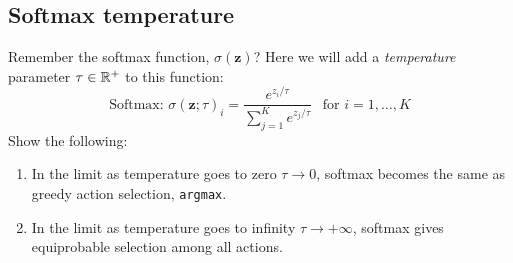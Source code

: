 \subsection{Softmax temperature}
Remember the softmax function, $\sigma(\mathbf{z})$? 
Here we will add a \emph{temperature} parameter $\tau \in \mathbb{R}^+$ to this function: 
$$
    \text{Softmax: } \sigma(\mathbf{z}; \tau)_i = \frac{e^{z_i/ \tau}}{\sum_{j=1}^K e^{z_j/ \tau}} \ \ \text{ for } i = 1, \dotsc, K 
$$
Show the following: 
\begin{enumerate}
    \item In the limit as temperature goes to zero $\tau \rightarrow 0 $, softmax becomes the same as greedy action selection, {\tt argmax}.
    \item In the limit as temperature goes to infinity $\tau \rightarrow +\infty$, softmax gives equiprobable selection among all actions. \\
\end{enumerate} 


